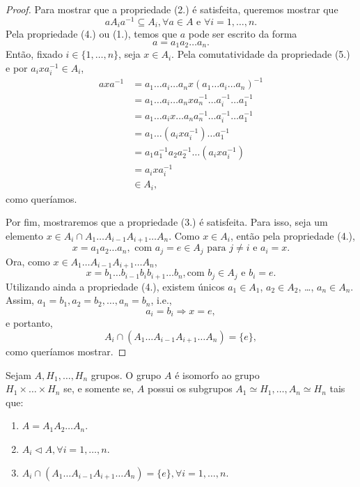 \documentclass[11pt,openany]{book}
\begin{document}
\begin{proof}
        Para mostrar que a propriedade (2.) é satisfeita, queremos mostrar que \[aA_ia^{-1} \subseteq A_i, \forall a \in A \text{ e } \forall i = 1, \dots, n.\]
        Pela propriedade (4.) ou (1.), temos que $a$ pode ser escrito da forma
        \[a = a_1a_2\dots a_n.\]
        Então, fixado $i \in \{1, \dots, n\}$, seja $x \in A_i$. Pela comutatividade da propriedade (5.) e por $a_i x a_i^{-1} \in A_i$,
        \begin{align*}
            axa^{-1} &= a_1\dots a_i\dots a_n x (a_1\dots a_i\dots a_n)^{-1}\\
            &= a_1\dots a_i\dots a_n x a_n^{-1}\dots a_i^{-1}\dots a_1^{-1}\\
            &= a_1\dots a_i x \dots a_n a_n^{-1}\dots a_i^{-1}\dots a_1^{-1}\\
            &= a_1\dots (a_i x a_i^{-1})\dots a_1^{-1}\\
            &= a_1 a_1^{-1} a_2 a_2^{-1} \dots (a_i x a_i^{-1}) \\
            &= a_i x a_i^{-1} \\
            &\in A_i,
        \end{align*}
        como queríamos.

        Por fim, mostraremos que a propriedade (3.) é satisfeita. Para isso, seja um elemento $x \in A_i \cap A_1 \dots A_{i-1}A_{i+1}\dots A_n$. Como $x \in A_i$, então pela propriedade (4.),
        \[x = a_1a_2\dots a_n, \text{ com $a_j = e \in A_j$ para $j \not= i$ e $a_i = x$}.\]
        Ora, como $x \in A_1 \dots A_{i-1}A_{i+1}\dots A_n$,
        \[x = b_1 \dots b_{i-1} b_i b_{i+1} \dots b_n, \text{com $b_j \in A_j$ e $b_i = e$}.\]
        Utilizando ainda a propriedade (4.), existem únicos $a_1 \in A_1$, $a_2 \in A_2$, \dots, $a_n \in A_n$.
        Assim, $a_1 = b_1, a_2 = b_2, \dots, a_n = b_n$, i.e.,
        \[a_i = b_i \Rightarrow x = e,\]
        e portanto,
        \[A_i \cap (A_1 \dots A_{i-1}A_{i+1}\dots A_n) = \{e\},\]
        como queríamos mostrar.
        
    \end{proof}


    \begin{theorem}
    \label{theorem:produto_direto_isomorfo}
        Sejam $A, H_1, \dots, H_n$ grupos. O grupo $A$ é isomorfo ao grupo \\ $H_1 \times \dots \times H_n$ se, e somente se, $A$ possui os subgrupos $A_1 \simeq H_1, \dots, A_n \simeq H_n$ tais que:
        \begin{enumerate}
            \item $A = A_1A_2 \dots A_n$.
            \item $A_i \triangleleft A, \forall i = 1, \dots, n$.
            \item $A_i \cap (A_1 \dots A_{i-1}A_{i+1}\dots A_n) = \{e\}, \forall i = 1, \dots, n$.
        \end{enumerate}
    \end{theorem}
\end{document}
